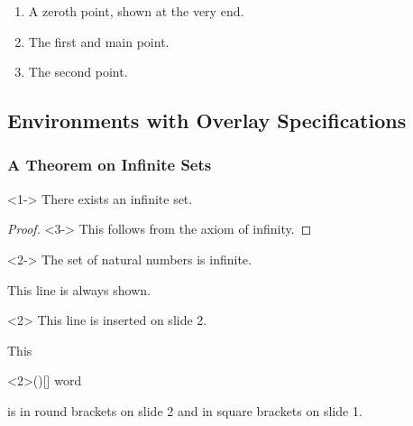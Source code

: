 \documentclass{beamer}
\begin{document}
\begin{frame}
  \begin{enumerate}
  \item<3-| alert@3>[0.] A zeroth point, shown at the very end.
  \item<1-| alert@1> The first and main point.
  \item<2-| alert@2> The second point.
  \end{enumerate}
\end{frame}
\subsection{Environments with Overlay Specifications}
\begin{frame}
  \frametitle{A Theorem on Infinite Sets}
  \begin{theorem}<1->
    There exists an infinite set.
  \end{theorem}
  \begin{proof}<3->
    This follows from the axiom of infinity.
  \end{proof}
  \begin{example}<2->
    The set of natural numbers is infinite.
  \end{example}
\end{frame}
\begin{frame}
  This line is always shown.
  \begin{onlyenv}<2>
    This line is inserted on slide 2.
  \end{onlyenv}
\end{frame}
\begin{frame}
  This
  \begin{altenv}<2>{(}{)}{[}{]}
    word
  \end{altenv}
  is in round brackets on slide 2 and in square brackets on slide 1.
\end{frame}
\end{document}
